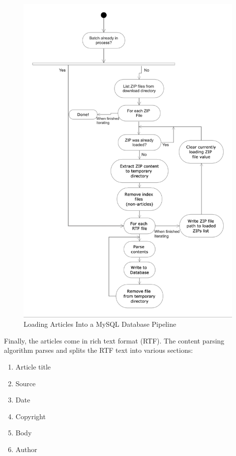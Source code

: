 \begin{figure}[h!]
      \centering
      \includegraphics[scale=0.7]{method/db_loader.png}
      \caption{Loading Articles Into a MySQL Database Pipeline}
      \label{database loader}
\end{figure}

Finally, the articles come in rich text format (RTF). The content parsing algorithm parses and splits the RTF text into various sections:
\begin{enumerate}
    \item Article title
    \item Source
    \item Date
    \item Copyright
    \item Body
    \item Author
\end{enumerate}

